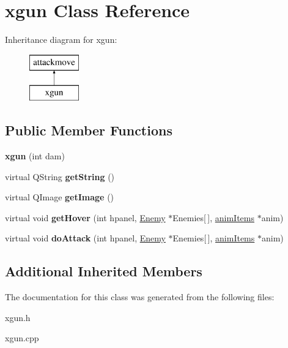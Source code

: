 \hypertarget{classxgun}{\section{xgun Class Reference}
\label{classxgun}
}
Inheritance diagram for xgun\-:\begin{figure}[H]
\begin{center}
\leavevmode
\includegraphics[height=2.000000cm]{classxgun}
\end{center}
\end{figure}
\subsection*{Public Member Functions}
\begin{DoxyCompactItemize}
\item 
\hypertarget{classxgun_a559665713dc1ae233184807d8b38ab7f}{{\bfseries xgun} (int dam)}\label{classxgun_a559665713dc1ae233184807d8b38ab7f}

\item 
\hypertarget{classxgun_a8d091859d655ff1703630ba7dd88a358}{virtual Q\-String {\bfseries get\-String} ()}\label{classxgun_a8d091859d655ff1703630ba7dd88a358}

\item 
\hypertarget{classxgun_adf5511bd6ed5dfb184a8a3b6b757608a}{virtual Q\-Image {\bfseries get\-Image} ()}\label{classxgun_adf5511bd6ed5dfb184a8a3b6b757608a}

\item 
\hypertarget{classxgun_aac799bda61860430dbbd9403b80a1efd}{virtual void {\bfseries get\-Hover} (int hpanel, \hyperlink{class_enemy}{Enemy} $\ast$Enemies\mbox{[}$\,$\mbox{]}, \hyperlink{classanim_items}{anim\-Items} $\ast$anim)}\label{classxgun_aac799bda61860430dbbd9403b80a1efd}

\item 
\hypertarget{classxgun_a8ede91a770bcedc6c4454615d38b5e84}{virtual void {\bfseries do\-Attack} (int hpanel, \hyperlink{class_enemy}{Enemy} $\ast$Enemies\mbox{[}$\,$\mbox{]}, \hyperlink{classanim_items}{anim\-Items} $\ast$anim)}\label{classxgun_a8ede91a770bcedc6c4454615d38b5e84}

\end{DoxyCompactItemize}
\subsection*{Additional Inherited Members}


The documentation for this class was generated from the following files\-:\begin{DoxyCompactItemize}
\item 
xgun.\-h\item 
xgun.\-cpp\end{DoxyCompactItemize}
